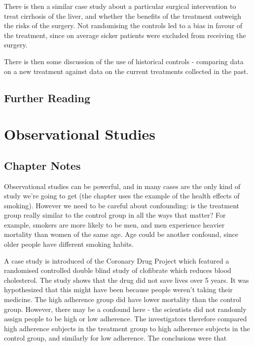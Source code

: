 \documentclass[
]{book}
\begin{document}
There is then a similar case study about a particular surgical intervention to treat cirrhosis of the liver, and whether the benefits of the treatment outweigh the risks of the surgery. Not randomising the controls led to a bias in favour of the treatment, since on average sicker patients were excluded from receiving the surgery.

There is then some discussion of the use of historical controls - comparing data on a new treatment against data on the current treatments collected in the past.

\hypertarget{further-reading}{%
\section*{Further Reading}\label{further-reading}}

\hypertarget{observational}{%
\chapter{Observational Studies}\label{observational}}

\hypertarget{chapter-notes-1}{%
\section{Chapter Notes}\label{chapter-notes-1}}

Observational studies can be powerful, and in many cases are the only kind of study we're going to get (the chapter uses the example of the health effects of smoking). However we need to be careful about confounding: is the treatment group really similar to the control group in all the ways that matter? For example, smokers are more likely to be men, and men experience heavier mortality than women of the same age. Age could be another confound, since older people have different smoking habits.

A case study is introduced of the Coronary Drug Project which featured a randomised controlled double blind study of clofibrate which reduces blood cholesterol. The study shows that the drug did not save lives over 5 years. It was hypothesized that this might have been because people weren't taking their medicine. The high adherence group did have lower mortality than the control group. However, there may be a confound here - the scientists did not randomly assign people to be high or low adherence. The investigators therefore compared high adherence subjects in the treatment group to high adherence subjects in the control group, and similarly for low adherence. The conclusions were that
\end{document}
